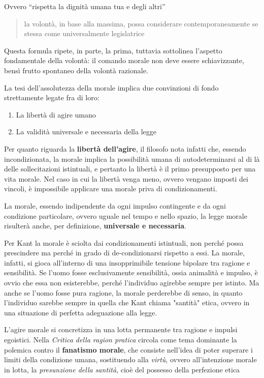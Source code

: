 \documentclass[a4paper, twoside, titlepage]{book}
\newcommand{\citazione}[1]{%
  \begin{quotation}
  #1
  \end{quotation}}
\begin{document}
Ovvero “rispetta la dignità umana tua e degli altri”
\citazione{la volontà, in base alla massima, possa considerare contemporaneamente se stessa come universalmente legislatrice}

Questa formula ripete, in parte, la prima, tuttavia sottolinea l’aspetto fondamentale della volontà: il comando morale non deve essere schiavizzante, bensì frutto spontaneo della volontà razionale.

La tesi dell’assolutezza della morale implica due convinzioni di fondo strettamente legate fra di loro:
\begin{enumerate}
\item La libertà di agire umano
\item La validità universale e necessaria della legge
\end{enumerate}

Per quanto riguarda la \textbf{libertà dell’agire}, il filosofo nota infatti che, essendo incondizionata, la morale implica la possibilità umana di autodeterminarsi al di là delle sollecitazioni istintuali, e pertanto la libertà è il primo presupposto per una vita morale. Nel caso in cui la libertà venga meno, ovvero vengano imposti dei vincoli, è impossibile applicare una morale priva di condizionamenti.

La morale, essendo indipendente da ogni impulso contingente e da ogni condizione particolare, ovvero uguale nel tempo e nello spazio, la legge morale risulterà anche, per definizione, \textbf{universale e necessaria}.

Per Kant la morale è sciolta dai condizionamenti istintuali, non perché possa prescindere ma perché in grado di de-condizionarsi rispetto a essi. 
La morale, infatti, si gioca all’interno di una insopprimibile tensione bipolare tra ragione e sensibilità.
Se l'uomo fosse esclusivamente sensibilità, ossia animalità e impulso, è ovvio che essa non esisterebbe, perché l’individuo agirebbe sempre per istinto. Ma anche se l'uomo fosse pura ragione, la morale perderebbe di senso, in quanto l'individuo sarebbe sempre in quella che Kant chiama "santità" etica, ovvero in una situazione di perfetta adeguazione alla legge.

L’agire morale si concretizza in una lotta permanente tra ragione e impulsi egoistici.
Nella \textit{Critica della ragion pratica} circola come tema dominante la polemica contro il \textbf{fanatismo morale}, che consiste nell’idea di poter superare i limiti della condizione umana, sostituendo alla \textit{virtù}, ovvero all’intenzione morale in lotta, la \textit{presunzione della santità}, cioè del possesso della perfezione etica
\end{document}
